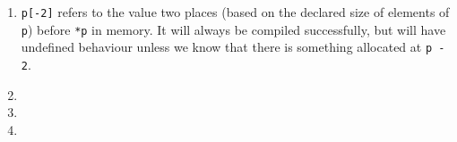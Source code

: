 \documentclass{article}
\begin{document}
\begin{enumerate}
  \item \texttt{p[-2]} refers to the value two places (based on the declared size of elements of \texttt{p}) before \texttt{*p} in memory. It will always be compiled successfully, but will have undefined behaviour unless we know that there is something allocated at \texttt{p - 2}.

  \item 

  \item 

  \item 
\end{enumerate}
\end{document}
